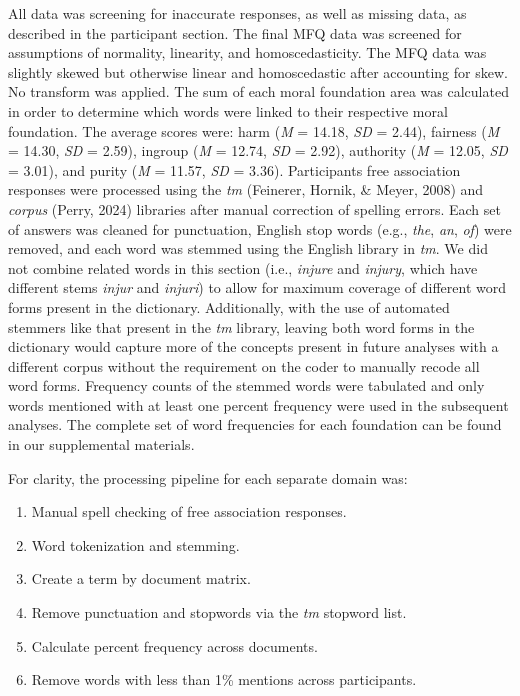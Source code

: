 \documentclass[
  man,floatsintext]{apa6}
\providecommand{\tightlist}{%
  \setlength{\itemsep}{0pt}\setlength{\parskip}{0pt}}
\begin{document}
All data was screening for inaccurate responses, as well as missing
data, as described in the participant section. The final MFQ data was
screened for assumptions of normality, linearity, and homoscedasticity.
The MFQ data was slightly skewed but otherwise linear and homoscedastic
after accounting for skew. No transform was applied. The sum of each
moral foundation area was calculated in order to determine which words
were linked to their respective moral foundation. The average scores
were: harm (\emph{M} = 14.18, \emph{SD} =
2.44), fairness (\emph{M} =
14.30, \emph{SD} =
2.59), ingroup (\emph{M} =
12.74, \emph{SD} =
2.92), authority (\emph{M} =
12.05, \emph{SD} =
3.01), and purity (\emph{M} =
11.57, \emph{SD} =
3.36). Participants free association
responses were processed using the \emph{tm} (Feinerer, Hornik, \& Meyer, 2008) and \emph{corpus}
(Perry, 2024) libraries after manual correction of spelling errors. Each
set of answers was cleaned for punctuation, English stop words (e.g.,
\emph{the}, \emph{an}, \emph{of}) were removed, and each word was stemmed using the
English library in \emph{tm}. We did not combine related words in this
section (i.e., \emph{injure} and \emph{injury}, which have different stems \emph{injur}
and \emph{injuri}) to allow for maximum coverage of different word forms
present in the dictionary. Additionally, with the use of automated
stemmers like that present in the \emph{tm} library, leaving both word forms
in the dictionary would capture more of the concepts present in future
analyses with a different corpus without the requirement on the coder to
manually recode all word forms. Frequency counts of the stemmed words
were tabulated and only words mentioned with at least one percent
frequency were used in the subsequent analyses. The complete set of word
frequencies for each foundation can be found in our supplemental
materials.

For clarity, the processing pipeline for each separate domain was:

\begin{enumerate}
\def\labelenumi{\arabic{enumi}.}
\tightlist
\item
  Manual spell checking of free association responses.
\item
  Word tokenization and stemming.
\item
  Create a term by document matrix.
\item
  Remove punctuation and stopwords via the \emph{tm} stopword list.
\item
  Calculate percent frequency across documents.
\item
  Remove words with less than 1\% mentions across participants.
\end{enumerate}
\end{document}
